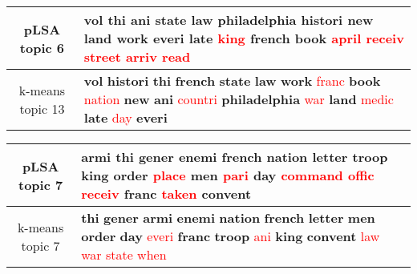 \begin{center}\begin{tabularx}{\textwidth} {
  | c | >{\raggedright\arraybackslash}X | } \hline 
pLSA topic 6 & \textbf{vol} \textbf{thi} \textbf{ani} \textbf{state} \textbf{law} \textbf{philadelphia} \textbf{histori} \textbf{new} \textbf{land} \textbf{work} \textbf{everi} \textbf{late} \textcolor{red}{king} \textbf{french} \textbf{book} \textcolor{red}{april} \textcolor{red}{receiv} \textcolor{red}{street} \textcolor{red}{arriv} \textcolor{red}{read} \\ \hline 
k-means topic 13 & \textbf{vol} \textbf{histori} \textbf{thi} \textbf{french} \textbf{state} \textbf{law} \textbf{work} \textcolor{red}{franc} \textbf{book} \textcolor{red}{nation} \textbf{new} \textbf{ani} \textcolor{red}{countri} \textbf{philadelphia} \textcolor{red}{war} \textbf{land} \textcolor{red}{medic} \textbf{late} \textcolor{red}{day} \textbf{everi} \\ \hline 
\end{tabularx}

\end{center}

\begin{center}\begin{tabularx}{\textwidth} {
  | c | >{\raggedright\arraybackslash}X | } \hline 
pLSA topic 7 & \textbf{armi} \textbf{thi} \textbf{gener} \textbf{enemi} \textbf{french} \textbf{nation} \textbf{letter} \textbf{troop} \textbf{king} \textbf{order} \textcolor{red}{place} \textbf{men} \textcolor{red}{pari} \textbf{day} \textcolor{red}{command} \textcolor{red}{offic} \textcolor{red}{receiv} \textbf{franc} \textcolor{red}{taken} \textbf{convent} \\ \hline 
k-means topic 7 & \textbf{thi} \textbf{gener} \textbf{armi} \textbf{enemi} \textbf{nation} \textbf{french} \textbf{letter} \textbf{men} \textbf{order} \textbf{day} \textcolor{red}{everi} \textbf{franc} \textbf{troop} \textcolor{red}{ani} \textbf{king} \textbf{convent} \textcolor{red}{law} \textcolor{red}{war} \textcolor{red}{state} \textcolor{red}{when} \\ \hline 
\end{tabularx}

\end{center}

